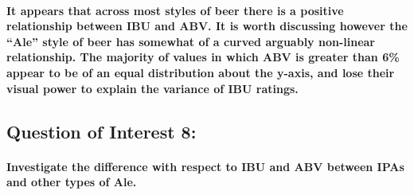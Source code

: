 \documentclass[
]{article}
\begin{document}
\hypertarget{it-appears-that-across-most-styles-of-beer-there-is-a-positive-relationship-between-ibu-and-abv.-it-is-worth-discussing-however-the-ale-style-of-beer-has-somewhat-of-a-curved-arguably-non-linear-relationship.-the-majority-of-values-in-which-abv-is-greater-than-6-appear-to-be-of-an-equal-distribution-about-the-y-axis-and-lose-their-visual-power-to-explain-the-variance-of-ibu-ratings.}{%
\paragraph{It appears that across most styles of beer there is a
positive relationship between IBU and ABV. It is worth discussing
however the ``Ale'' style of beer has somewhat of a curved arguably
non-linear relationship. The majority of values in which ABV is greater
than 6\% appear to be of an equal distribution about the y-axis, and
lose their visual power to explain the variance of IBU
ratings.}\label{it-appears-that-across-most-styles-of-beer-there-is-a-positive-relationship-between-ibu-and-abv.-it-is-worth-discussing-however-the-ale-style-of-beer-has-somewhat-of-a-curved-arguably-non-linear-relationship.-the-majority-of-values-in-which-abv-is-greater-than-6-appear-to-be-of-an-equal-distribution-about-the-y-axis-and-lose-their-visual-power-to-explain-the-variance-of-ibu-ratings.}}

\hypertarget{question-of-interest-8}{%
\subsection{Question of Interest 8:}\label{question-of-interest-8}}

\hypertarget{investigate-the-difference-with-respect-to-ibu-and-abv-between-ipas-and-other-types-of-ale.}{%
\paragraph{Investigate the difference with respect to IBU and ABV
between IPAs and other types of
Ale.}\label{investigate-the-difference-with-respect-to-ibu-and-abv-between-ipas-and-other-types-of-ale.}}
\end{document}
